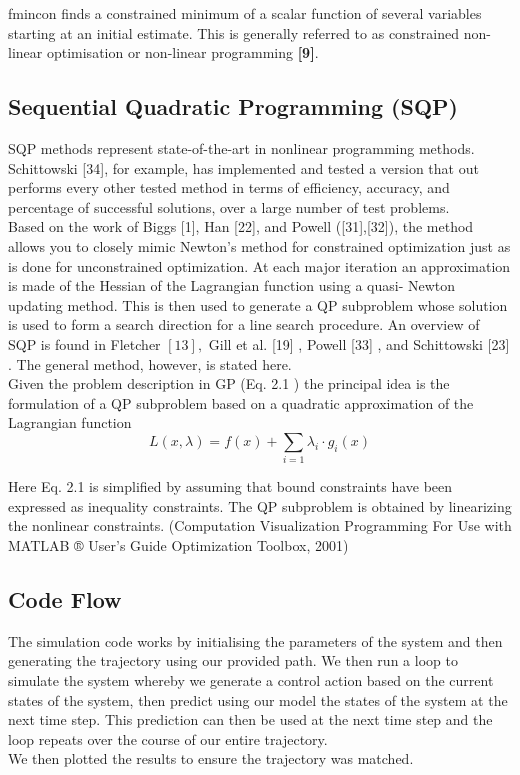 \documentclass{UoNMCHA}
\numberwithin{equation}{section}
\begin{document}
	fmincon finds a constrained minimum of a scalar function of several variables starting at an initial estimate. This is generally referred to as constrained non-linear optimisation or non-linear programming \textbf{[9]}. 
	
	\subsection{Sequential Quadratic Programming (SQP)}
	
	SQP methods represent state-of-the-art in nonlinear programming methods. Schittowski [34], for
	example, has implemented and tested a version that out performs every other tested method in terms of
	efficiency, accuracy, and percentage of successful solutions, over a large number of test problems.\\
	Based on the work of Biggs [1], Han [22], and Powell ([31],[32]), the method allows you to closely
	mimic Newton's method for constrained optimization just as is done for unconstrained optimization. At
	each major iteration an approximation is made of the Hessian of the Lagrangian function using a quasi-
	Newton updating method. This is then used to generate a QP subproblem whose solution is used to
	form a search direction for a line search procedure. An overview of SQP is found in Fletcher $[13],$ Gill
	et al. [19] , Powell [33] , and Schittowski [23] . The general method, however, is stated here.\\
	
	Given the problem description in GP (Eq. 2.1 ) the principal idea is the formulation of a QP subproblem
	based on a quadratic approximation of the Lagrangian function
	$$
	L(x, \lambda)=f(x)+\sum_{i=1} \lambda_{i} \cdot g_{i}(x)
	$$
	
	Here Eq. 2.1 is simplified by assuming that bound constraints have been expressed as inequality constraints. The QP subproblem is obtained by linearizing the nonlinear constraints.  (Computation Visualization Programming For Use with MATLAB ® User’s Guide Optimization Toolbox, 2001) \\
	
	\subsection*{Code Flow}
	The simulation code works by initialising the parameters of the system and then generating the trajectory using our provided path. We then run a loop to simulate the system whereby we generate a control action based on the current states of the system, then predict using our model the states of the system at the next time step. This prediction can then be used at the next time step and the loop repeats over the course of our entire trajectory. \\	
	We then plotted the results to ensure the trajectory was matched.
	
\end{document}
